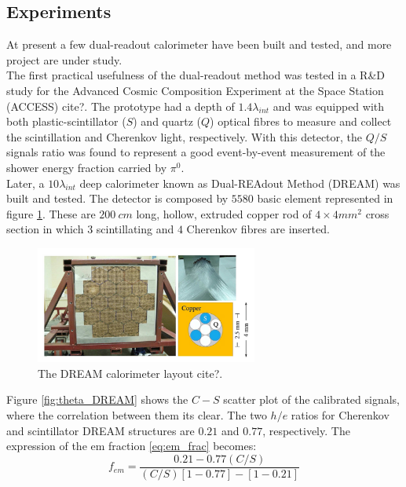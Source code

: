 \subsection{Experiments}
At present a few dual-readout calorimeter have been built and tested, and more project are under study.\\
The first practical usefulness of the dual-readout method was tested in a R\&D study for the Advanced Cosmic Composition Experiment at the Space Station (ACCESS) cite?. The prototype had a depth of $1.4\lambda_{int}$ and was equipped with both plastic-scintillator ($S$) and quartz ($Q$) optical fibres to measure and collect the scintillation and Cherenkov light, respectively. With this detector, the $Q/S$ signals ratio was found to represent a good event-by-event measurement of the shower energy fraction carried by $\pi^0$.\\
Later, a $10 \lambda_{int}$ deep calorimeter known as Dual-REAdout Method (DREAM) was built and tested. 
The detector is composed by $5580$ basic element represented in figure \ref{fig:DREAM}. These are $200\ cm$ long, hollow, extruded copper rod of $4\times 4 mm^2$ cross section in which $3$ scintillating and $4$ Cherenkov fibres are inserted.
\begin{figure}
	\centering
	\includegraphics[width=0.65\textwidth]{IMG/Cap2/DREAM.png}
	\caption{The DREAM calorimeter layout cite?.}
	\label{fig:DREAM}
\end{figure}

Figure \ref{fig:theta_DREAM} shows the $C-S$ scatter plot of the calibrated signals, where the correlation between them its clear.
The two $h/e$ ratios for Cherenkov and scintillator DREAM structures are $0.21$ and $0.77$, respectively. The expression of the em fraction \ref{eq:em_frac} becomes:
\begin{equation}
    f_{em} = \frac{0.21-0.77(C/S)}{(C/S)\left[1-0.77\right]-\left[1-0.21\right]}
\end{equation}

